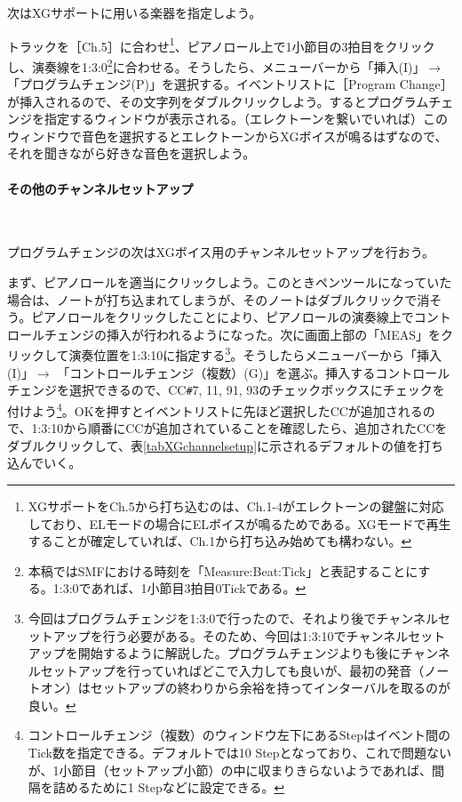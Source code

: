\documentclass[uplatex, 10pt, dvipdfmx]{jsarticle}
\numberwithin{equation}{section}
\begin{document}
次はXGサポートに用いる楽器を指定しよう。

トラックを［Ch.5］に合わせ\footnote{XGサポートをCh.5から打ち込むのは、Ch.1-4がエレクトーンの鍵盤に対応しており、ELモードの場合にELボイスが鳴るためである。XGモードで再生することが確定していれば、Ch.1から打ち込み始めても構わない。}、ピアノロール上で1小節目の3拍目をクリックし、演奏線を1:3:0\footnote{本稿ではSMFにおける時刻を「Measure:Beat:Tick」と表記することにする。1:3:0であれば、1小節目3拍目0Tickである。}に合わせる。そうしたら、メニューバーから「挿入(I)」$\rightarrow$ 「プログラムチェンジ(P)」を選択する。イベントリストに［Program Change］が挿入されるので、その文字列をダブルクリックしよう。するとプログラムチェンジを指定するウィンドウが表示される。（エレクトーンを繋いでいれば）このウィンドウで音色を選択するとエレクトーンからXGボイスが鳴るはずなので、それを聞きながら好きな音色を選択しよう。

\paragraph{その他のチャンネルセットアップ} \ 

プログラムチェンジの次はXGボイス用のチャンネルセットアップを行おう。

まず、ピアノロールを適当にクリックしよう。このときペンツールになっていた場合は、ノートが打ち込まれてしまうが、そのノートはダブルクリックで消そう。ピアノロールをクリックしたことにより、ピアノロールの演奏線上でコントロールチェンジの挿入が行われるようになった。次に画面上部の「MEAS」をクリックして演奏位置を1:3:10に指定する\footnote{今回はプログラムチェンジを1:3:0で行ったので、それより後でチャンネルセットアップを行う必要がある。そのため、今回は1:3:10でチャンネルセットアップを開始するように解説した。プログラムチェンジよりも後にチャンネルセットアップを行っていればどこで入力しても良いが、最初の発音（ノートオン）はセットアップの終わりから余裕を持ってインターバルを取るのが良い。}。そうしたらメニューバーから「挿入(I)」$\rightarrow$ 「コントロールチェンジ（複数）(G)」を選ぶ。挿入するコントロールチェンジを選択できるので、CC\texttt{\#}7, 11, 91, 93のチェックボックスにチェックを付けよう\footnote{コントロールチェンジ（複数）のウィンドウ左下にあるStepはイベント間のTick数を指定できる。デフォルトでは10 Stepとなっており、これで問題ないが、1小節目（セットアップ小節）の中に収まりきらないようであれば、間隔を詰めるために1 Stepなどに設定できる。}。OKを押すとイベントリストに先ほど選択したCCが追加されるので、1:3:10から順番にCCが追加されていることを確認したら、追加されたCCをダブルクリックして、表\ref{tabXGchannelsetup}に示されるデフォルトの値を打ち込んでいく。
\end{document}
